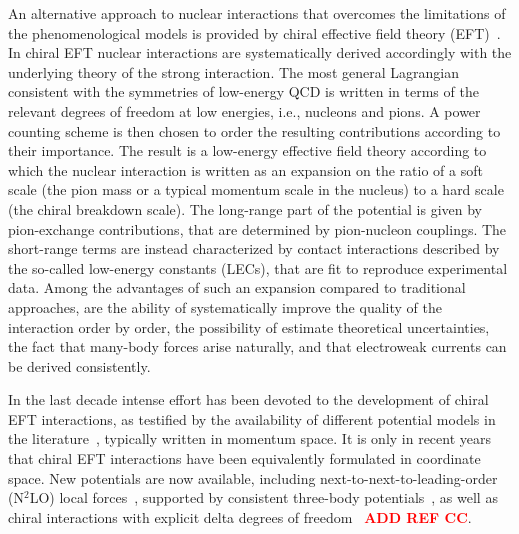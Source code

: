 \documentclass[aps,prc,twocolumn,superscriptaddress,floatfix]{revtex4-1}
\newcommand{\red}[1]{\protect\textcolor{red}{#1}}
\begin{document}
An alternative approach to nuclear interactions that overcomes the limitations
of the phenomenological models is provided by chiral effective field theory 
(EFT)~\cite{Epelbaum:2009,Machleidt:2011}.
In chiral EFT nuclear interactions are systematically derived accordingly with 
the underlying theory of the strong interaction. The most general 
Lagrangian consistent with the symmetries of low-energy QCD is written in terms 
of the relevant degrees of freedom at low energies, i.e., nucleons and pions.
A power counting scheme is then chosen to order the resulting contributions according 
to their importance. The result is a low-energy effective field theory according
to which the nuclear interaction is written as an expansion on the ratio of a 
soft scale (the pion mass or a typical momentum scale in the nucleus) to a
hard scale (the chiral breakdown scale). The long-range part of the potential
is given by pion-exchange contributions, that are determined by pion-nucleon 
couplings. The short-range terms are instead characterized by contact
interactions described by the so-called low-energy constants (LECs), that are fit to 
reproduce experimental data. Among the advantages of such an 
expansion compared to traditional approaches, are the ability of 
systematically improve the quality of the interaction order by order, 
the possibility of estimate theoretical uncertainties, the fact that
many-body forces arise naturally, and that electroweak currents can 
be derived consistently.

In the last decade intense effort has been devoted to the 
development of chiral EFT interactions, as testified by the 
availability of different potential models in the 
literature~\cite{Epelbaum:2009,Machleidt:2011,Ekstrom:2013,Entem:2015,
Epelbaum:2015,Ekstrom:2015,Ekstrom:2017}, typically written in momentum 
space. It is only in recent
years that chiral EFT interactions have been equivalently formulated 
in coordinate space. New potentials are now available, including 
next-to-next-to-leading-order (N$^2$LO) local 
forces~\cite{Gezerlis:2013,Gezerlis:2014}, supported by consistent
three-body potentials~\cite{Tews:2016,Lynn:2016}, as
well as chiral interactions with explicit delta degrees of
freedom~\cite{Piarulli:2015,Piarulli:2016,Piarulli:2017}
\red{\bf ADD REF CC}.
\end{document}
